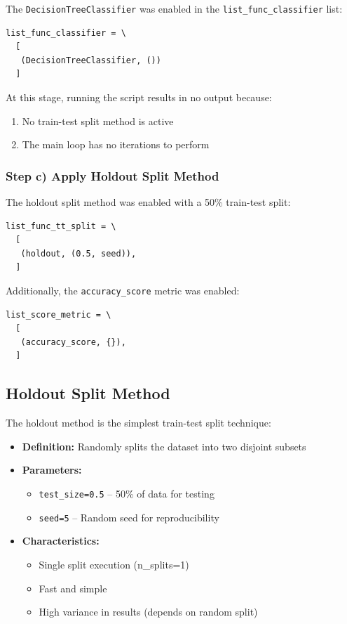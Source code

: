 \documentclass[12pt,a4paper]{article}
\begin{document}
The \texttt{DecisionTreeClassifier} was enabled in the \texttt{list\_func\_classifier} list:

\begin{lstlisting}[caption={Enabled Decision Tree Classifier}]
list_func_classifier = \
  [
   (DecisionTreeClassifier, ())
  ]
\end{lstlisting}

At this stage, running the script results in no output because:
\begin{enumerate}
    \item No train-test split method is active
    \item The main loop has no iterations to perform
\end{enumerate}

\subsubsection{Step c) Apply Holdout Split Method}

The holdout split method was enabled with a 50\% train-test split:

\begin{lstlisting}[caption={Enabled holdout split}]
list_func_tt_split = \
  [
   (holdout, (0.5, seed)),
  ]
\end{lstlisting}

Additionally, the \texttt{accuracy\_score} metric was enabled:

\begin{lstlisting}[caption={Enabled accuracy metric}]
list_score_metric = \
  [
   (accuracy_score, {}),
  ]
\end{lstlisting}

\subsection{Holdout Split Method}

The holdout method is the simplest train-test split technique:

\begin{itemize}
    \item \textbf{Definition:} Randomly splits the dataset into two disjoint subsets
    \item \textbf{Parameters:} 
    \begin{itemize}
        \item \texttt{test\_size=0.5} -- 50\% of data for testing
        \item \texttt{seed=5} -- Random seed for reproducibility
    \end{itemize}
    \item \textbf{Characteristics:}
    \begin{itemize}
        \item Single split execution (n\_splits=1)
        \item Fast and simple
        \item High variance in results (depends on random split)
    \end{itemize}
\end{itemize}
\end{document}
